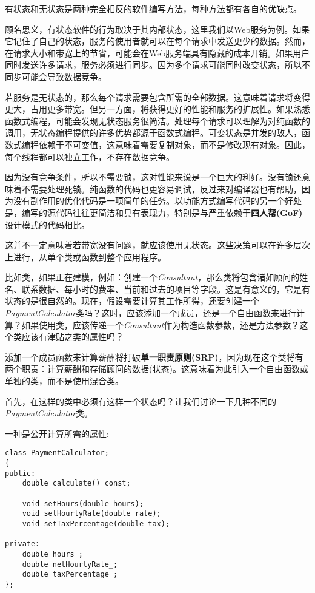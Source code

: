 
有状态和无状态是两种完全相反的软件编写方法，每种方法都有各自的优缺点。

顾名思义，有状态软件的行为取决于其内部状态，这里我们以Web服务为例。如果它记住了自己的状态，服务的使用者就可以在每个请求中发送更少的数据。然而，在请求大小和带宽上的节省，可能会在Web服务端具有隐藏的成本开销。如果用户同时发送许多请求，服务必须进行同步。因为多个请求可能同时改变状态，所以不同步可能会导致数据竞争。

若服务是无状态的，那么每个请求需要包含所需的全部数据。这意味着请求将变得更大，占用更多带宽。但另一方面，将获得更好的性能和服务的扩展性。如果熟悉函数式编程，可能会发现无状态服务很简洁。处理每个请求可以理解为对纯函数的调用，无状态编程提供的许多优势都源于函数式编程。可变状态是并发的敌人，函数式编程依赖于不可变值，这意味着需要复制对象，而不是修改现有对象。因此，每个线程都可以独立工作，不存在数据竞争。

因为没有竞争条件，所以不需要锁，这对性能来说是一个巨大的利好。没有锁还意味着不需要处理死锁。纯函数的代码也更容易调试，反过来对编译器也有帮助，因为没有副作用的优化代码是一项简单的任务。以功能方式编写代码的另一个好处是，编写的源代码往往更简洁和具有表现力，特别是与严重依赖于\textbf{四人帮(GoF)}设计模式的代码相比。

这并不一定意味着若带宽没有问题，就应该使用无状态。这些决策可以在许多层次上进行，从单个类或函数到整个应用程序。

比如类，如果正在建模，例如：创建一个\textit{Consultant}，那么类将包含诸如顾问的姓名、联系数据、每小时的费率、当前和过去的项目等字段。这是有意义的，它是有状态的是很自然的。现在，假设需要计算其工作所得，还要创建一个\textit{PaymentCalculator}类吗？这时，应该添加一个成员，还是一个自由函数来进行计算？如果使用类，应该传递一个\textit{Consultant}作为构造函数参数，还是方法参数？这个类应该有津贴之类的属性吗？

添加一个成员函数来计算薪酬将打破\textbf{单一职责原则(SRP)}，因为现在这个类将有两个职责：计算薪酬和存储顾问的数据(状态)。这意味着为此引入一个自由函数或单独的类，而不是使用混合类。

首先，在这样的类中必须有这样一个状态吗？让我们讨论一下几种不同的\textit{PaymentCalculator}类。

一种是公开计算所需的属性:

\begin{lstlisting}[style=styleCXX]
class PaymentCalculator;
{
public:
	double calculate() const;
	
	void setHours(double hours);
	void setHourlyRate(double rate);
	void setTaxPercentage(double tax);
	
private:
	double hours_;
	double netHourlyRate_;
	double taxPercentage_;
};
\end{lstlisting}

